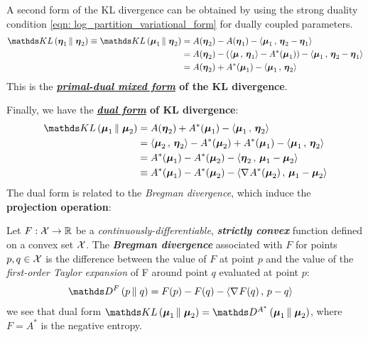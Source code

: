\documentclass[11pt]{article}
\begin{document}
A second form of the KL divergence can be obtained by using the strong duality condition \eqref{eqn: log_partition_variational_form} for dually coupled parameters.
\begin{align}
 \kl{\mb{\eta}_1}{\mb{\eta}_2} \equiv  \kl{\mb{\mu}_1}{\mb{\eta}_2}&= A(\mb{\eta}_2) - A(\mb{\eta}_1) -  \inn{\mb{\mu}_{1}}{\mb{\eta}_2 - \mb{\eta}_1} \nonumber\\
&= A(\mb{\eta}_2) - \paren{\inn{\mb{\mu}}{\mb{\eta}_1} - A^{*}(\mb{\mu}_{1})} -  \inn{\mb{\mu}_{1}}{\mb{\eta}_2 - \mb{\eta}_1}  \nonumber\\
&= A(\mb{\eta}_2) + A^{*}(\mb{\mu}_1) - \inn{\mb{\mu}_{1}}{\mb{\eta}_2}  \label{eqn: kl_primal_dual}
\end{align} This is the \textbf{\emph{\underline{primal-dual mixed form}} of the KL divergence}.

Finally, we have the \textbf{\emph{\underline{dual form}} of KL divergence}: 
\begin{align}
 \kl{\mb{\mu}_1}{\mb{\mu}_2} &= A(\mb{\eta}_2) + A^{*}(\mb{\mu}_1) - \inn{\mb{\mu}_{1}}{\mb{\eta}_2}  \nonumber\\
 &= \inn{\mb{\mu}_2}{\mb{\eta}_2} - A^{*}(\mb{\mu}_{2}) + A^{*}(\mb{\mu}_1) - \inn{\mb{\mu}_{1}}{\mb{\eta}_2}  \nonumber\\
 &= A^{*}(\mb{\mu}_1) - A^{*}(\mb{\mu}_{2}) - \inn{\mb{\eta}_2}{\mb{\mu}_{1} - \mb{\mu}_{2}}  \label{eqn: kl_dual} \\
 &\equiv  A^{*}(\mb{\mu}_1) - A^{*}(\mb{\mu}_{2}) - \inn{\grad{}{A^{*}}(\mb{\mu}_{2})}{\mb{\mu}_{1} - \mb{\mu}_{2}} \nonumber
\end{align} The dual form is related to the \emph{Bregman divergence}, which induce the \textbf{projection operation}:
\begin{definition}
Let $F: {\mathcal X} \rightarrow {\mathbb R}$ be a \emph{continuously-differentiable}, \emph{\textbf{strictly convex}} function defined on a convex set ${\mathcal X}$. The \textbf{\emph{Bregman divergence}} associated with $F$ for points $p,q \in {\mathcal X}$ is the difference between the value of $F$ at point $p$ and the value of the \emph{first-order Taylor expansion} of F around point $q$ evaluated at point $p$:
\begin{align}
\divg{F}{p}{q} &= F(p) - F(q) - \inn{\grad{}{F}(q)}{p - q} \label{eqn: bregman_divg}
\end{align} we see that dual form $\kl{\mb{\mu}_1}{\mb{\mu}_2} = \divg{A^{*}}{\mb{\mu}_1}{\mb{\mu}_2}$, where $F = A^{*}$ is the negative entropy.
\end{definition}

\newpage


\end{document}
